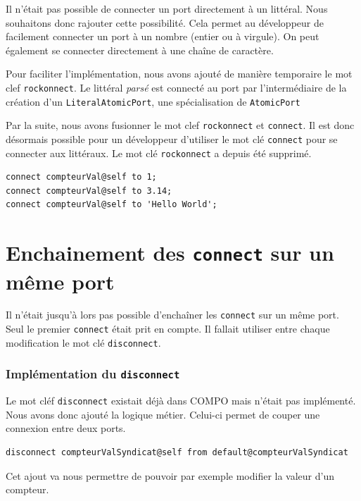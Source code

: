 \documentclass[11pt,a4paper,openany,oneside]{book}
\begin{document}
Il n'était pas possible de connecter un port directement à un littéral. Nous souhaitons donc rajouter cette possibilité. Cela permet au développeur de facilement connecter un port à un nombre (entier ou à virgule). On peut également se connecter directement à une chaîne de caractère. 

Pour faciliter l'implémentation, nous avons ajouté de manière temporaire le mot clef \texttt{rockonnect}. Le littéral \textit{parsé} est connecté au port par l'intermédiaire de la création d'un \texttt{LiteralAtomicPort}, une spécialisation de \texttt{AtomicPort}

Par la suite, nous avons fusionner le mot clef \texttt{rockonnect} et \texttt{connect}. Il est donc désormais possible pour un développeur d'utiliser le mot clé \texttt{connect} pour se connecter aux littéraux. Le mot clé \texttt{rockonnect} a depuis été supprimé.

\begin{lstlisting}[language=Compo, frame=single, caption=Syntaxe d'une connexion à un littéral]
connect compteurVal@self to 1;
connect compteurVal@self to 3.14;
connect compteurVal@self to 'Hello World';
\end{lstlisting}


\section{Enchainement des \texttt{connect} sur un même port}

Il n'était jusqu'à lors pas possible d'enchaîner les \texttt{connect} sur un même port. Seul le premier \texttt{connect} était prit en compte. Il fallait utiliser entre chaque modification le mot clé \texttt{disconnect}.


\subsubsection{Implémentation du \texttt{disconnect}}

Le mot cléf \texttt{disconnect} existait déjà dans COMPO mais n'était pas implémenté. Nous avons donc ajouté la logique métier. Celui-ci permet de couper une connexion entre deux ports.

\begin{lstlisting}[language=Compo, frame=single, caption=Syntaxe d'une déconnexion]
disconnect compteurValSyndicat@self from default@compteurValSyndicat
\end{lstlisting}

Cet ajout va nous permettre de pouvoir par exemple modifier la valeur d'un compteur.
\end{document}
